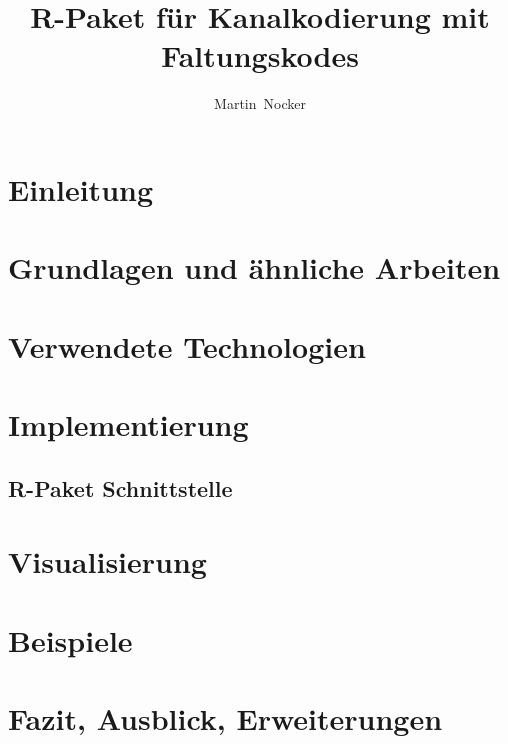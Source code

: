 \documentclass[germanthesis]{thesis-style}
\author{Martin~Nocker}
\title{R-Paket für Kanalkodierung mit Faltungskodes}
\begin{document}
\maketitle

\begin{abstract}

\end{abstract}

\tableofcontents
\clearpage
{}

\chapter{Einleitung}
\label{kapitel:einleitung}


\chapter{Grundlagen und ähnliche Arbeiten}
\label{kapitel:grundlagen}

\chapter{Verwendete Technologien}
\label{kapitel:technologien}


\chapter{Implementierung}
\label{kapitel:implementierung}


\section{R-Paket Schnittstelle}
\label{kapitel:interface}


\chapter{Visualisierung}
\label{kapitel:visualisierung}


\chapter{Beispiele}
\label{kapitel:beispiele}

\chapter{Fazit, Ausblick, Erweiterungen}

\label{kapitel:fazit}

\cleardoublepage%

\listofabbreviations
\clearpage

\listoffigures
\clearpage

\listoftables
\clearpage

\lstlistoflistings
\clearpage

\printbibliography
\end{document}
